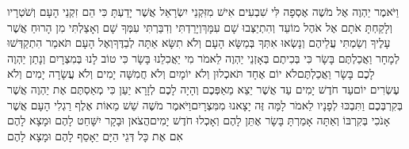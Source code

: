 \documentclass[../main/main.tex]{subfiles}
\begin{document}
\begin{multicols*}{\ncols}
וַיֹּאמֶר יַהְוֶה אֶל מֹשֶׁה אֶסְפָה לִּי שִׁבְעִים אִישׁ מִזִּקְנֵי יִשְׂרָאֵל אֲשֶׁר יָדַעְתָּ כִּי הֵם זִקְנֵי הָעָם וְשֹׁטְרָיו וְלָקַחְתָּ אֹתָם אֶל אֹהֶל מוֹעֵד וְהִתְיַצְּבוּ שָׁם עִמָּךְ\PreVerseSpace{}וְיָרַדְתִּי וְדִבַּרְתִּי עִמְּךָ שָׁם וְאָצַלְתִּי מִן הָרוּחַ אֲשֶׁר עָלֶיךָ וְשַׂמְתִּי עֲלֵיהֶם וְנָשְׂאוּ אִתְּךָ בְּמַשָּׂא הָעָם וְלֹא תִשָּׂא אַתָּה לְבַדֶּךָ\PreVerseSpace{}וְאֶל הָעָם תֹּאמַר הִתְקַדְּשׁוּ לְמָחָר וַאֲכַלְתֶּם בָּשָׂר כִּי בְּכִיתֶם בְּאָזְנֵי יַהְוֶה לֵאמֹר מִי יַאֲכִלֵנוּ בָּשָׂר כִּי טוֹב לָנוּ בְּמִצְרָיִם וְנָתַן יַהְוֶה לָכֶם בָּשָׂר וַאֲכַלְתֶּם\PreVerseSpace{}לֹא יוֹם אֶחָד תֹּאכְלוּן וְלֹא יוֹמָיִם וְלֹא חֲמִשָּׁה יָמִים וְלֹא עֲשָׂרָה יָמִים וְלֹא עֶשְׂרִים יוֹם\PreVerseSpace{}עַד חֹדֶשׁ יָמִים עַד אֲשֶׁר יֵצֵא מֵאַפְּכֶם וְהָיָה לָכֶם לְזָרָא יַעַן כִּי מְאַסְתֶּם אֶת יַהְוֶה אֲשֶׁר בְּקִרְבְּכֶם וַתִּבְכּוּ לְפָנָיו לֵאמֹר לָמָּה זֶּה יָצָאנוּ מִמִּצְרָיִם\PreVerseSpace{}וַיֹּאמֶר מֹשֶׁה שֵׁשׁ מֵאוֹת אֶלֶף רַגְלִי הָעָם אֲשֶׁר אָנֹכִי בְּקִרְבּוֹ וְאַתָּה אָמַרְתָּ בָּשָׂר אֶתֵּן לָהֶם וְאָכְלוּ חֹדֶשׁ יָמִים\PreVerseSpace{}הֲצֹאן וּבָקָר יִשָּׁחֵט לָהֶם וּמָצָא לָהֶם אִם אֶת כָּל דְּגֵי הַיָּם יֵאָסֵף לָהֶם וּמָצָא לָהֶם\OpenSection{}\par

\end{multicols*}
\end{document}

